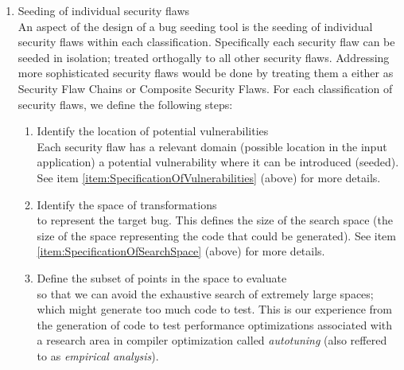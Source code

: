 \begin{enumerate}
   \item Seeding of individual security flaws \\
         An aspect of the design of a bug seeding tool is the seeding of individual
         security flaws within each classification. Specifically each security flaw can be
         seeded in isolation; treated orthogally to all other security flaws. Addressing
         more sophisticated security flaws would be done by treating them a either as
         Security Flaw Chains or Composite Security Flaws.
         For each classification of security flaws, we define the following steps:
            \begin{enumerate}
               \item Identify the location of potential vulnerabilities \\ Each security
                     flaw has a relevant domain (possible location in the input
                     application) a potential vulnerability where it 
                     can be introduced (seeded).  See item 
                     \ref{item:SpecificationOfVulnerabilities} (above) for more details.

               \item Identify the space of transformations \\ to represent the target bug.
                     This defines the size of the search space (the size of the 
                     space representing the code that could be generated). See item 
                     \ref{item:SpecificationOfSearchSpace} (above) for more details.

               \item Define the subset of points in the space to evaluate \\ so that we can
                     avoid the exhaustive search of extremely large spaces; which might
                     generate too much code to test. This is our experience from 
                     the generation of code to test performance optimizations associated
                     with a research area in compiler optimization called {\em autotuning}
                     (also reffered to as {\em empirical analysis}).


\end{enumerate}
\end{enumerate}
